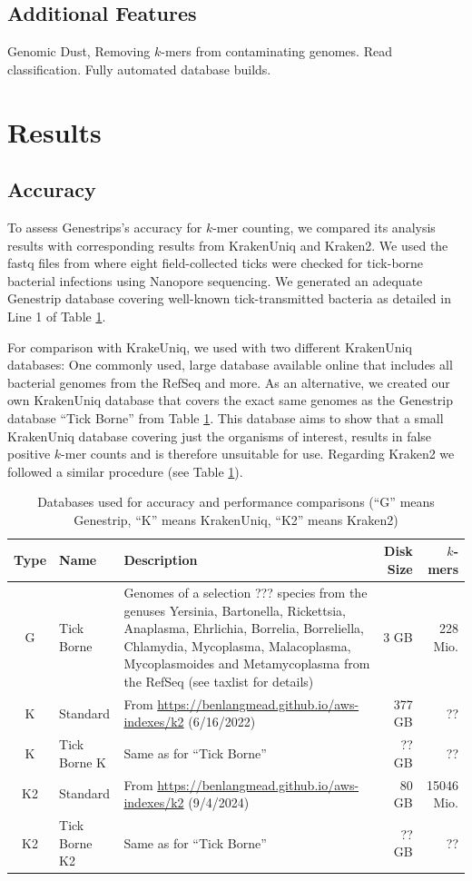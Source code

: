 \documentclass[letterpaper,11pt,leqno]{article}
\begin{document}
\subsection{Additional Features}

Genomic Dust, Removing $k$-mers from contaminating genomes. Read classification. Fully automated database builds.

\section{Results}\label{results}

\subsection{Accuracy}

To assess Genestrips's accuracy for $k$-mer counting, we compared its analysis results with 
corresponding results from KrakenUniq and Kraken2. We used the fastq files from \citep{nanoporeticks} where eight field-collected ticks were checked for tick-borne bacterial infections using Nanopore sequencing.
We generated an adequate Genestrip database covering well-known tick-transmitted bacteria as detailed in Line 1 of 
Table \ref{dbs}.

For comparison with KrakeUniq, we used with two different KrakenUniq databases: One commonly used, large database available online that includes all bacterial genomes from the RefSeq and more.
As an alternative, we created our own KrakenUniq database that covers the exact same genomes as the Genestrip database \enquote{Tick Borne} from Table \ref{dbs}. This database aims to show that a small KrakenUniq database covering just the organisms of interest, results in false positive $k$-mer counts and is therefore unsuitable for use.
Regarding Kraken2 we followed a similar procedure (see Table \ref{dbs}).

\begin{table}[h]
\centering
\begin{tabular}{c|p{2cm}|p{6cm}|r|r}
Type & Name & Description & Disk Size &$k$-mers\\
  \hline
G & Tick Borne & Genomes of a selection ??? species from the genuses Yersinia, Bartonella, Rickettsia, Anaplasma, Ehrlichia, Borrelia, Borreliella, Chlamydia, Mycoplasma, Malacoplasma, Mycoplasmoides and Metamycoplasma from the RefSeq (see taxlist for details)& 3 GB & 228 Mio. \\
K & Standard & From \url{https://benlangmead.github.io/aws-indexes/k2} (6/16/2022) & 377 GB & ?? \\
K & Tick Borne K & Same as for \enquote{Tick Borne} & ?? GB & ?? \\
K2 & Standard & From \url{https://benlangmead.github.io/aws-indexes/k2} (9/4/2024) & 80 GB & 15046 Mio. \\  
K2 & Tick Borne K2 & Same as for \enquote{Tick Borne} & ?? GB & ?? \\
\end{tabular}
\caption{Databases used for accuracy and performance comparisons (\enquote{G} means Genestrip, \enquote{K} means KrakenUniq, \enquote{K2} means Kraken2)}\label{dbs}
\end{table}
\end{document}
